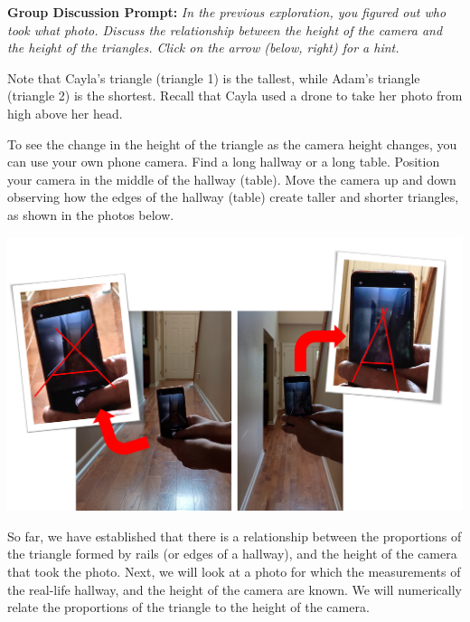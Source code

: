 \documentclass{ximera}
\begin{document}
\begin{exploration}
\textbf{Group Discussion Prompt:}
\emph{In the previous exploration, you figured out who took what photo.  Discuss the relationship between the height of the camera and the height of the triangles.  Click on the arrow (below, right) for a hint.}

\begin{expandable}
    Note that Cayla's triangle (triangle 1) is the tallest, while Adam's triangle (triangle 2) is the shortest.  Recall that Cayla used a drone to take her photo from high above her head.  
\end{expandable}

To see the change in the height of the triangle as the camera height changes, you can use your own phone camera.  Find a long hallway or a long table.  Position your camera in the middle of the hallway (table).  Move the camera up and down observing how the edges of the hallway (table) create taller and shorter triangles, as shown in the photos below.

\begin{image}
         \includegraphics[width=6in]{doItYourself.jpg}
\end{image}

\begin{multipleChoice}
    \end{multipleChoice}

\end{exploration}

So far, we have established that there is a relationship between the proportions of the triangle formed by rails (or edges of a hallway), and the height of the camera that took the photo.  Next, we will look at a photo for which the measurements of the real-life hallway, and the height of the camera are known.  We will numerically relate the proportions of the triangle to the height of the camera.
\end{document}

